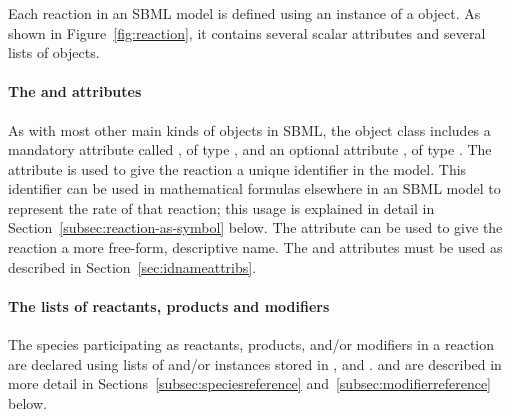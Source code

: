 

\subsubsection{}
\label{sec:reaction-type}
\label{sec:listofreactants}
\label{sec:listofproducts}
\label{sec:listofmodifiers}

Each reaction in an SBML model is defined using an instance of a
\Reaction object.  As shown in Figure~\vref{fig:reaction}, it
contains several scalar attributes and several lists of objects.


\paragraph{The  and  attributes}

As with most other main kinds of objects in SBML, the
\Reaction object class
includes a mandatory attribute called , of type
, and an optional attribute , of type
.  The  attribute is used to give the
reaction a unique identifier in the model.  This identifier can be
used in mathematical formulas elsewhere in an SBML model to
represent the rate of that reaction; this usage is explained in
detail in Section~\ref{subsec:reaction-as-symbol} below.  The
 attribute can be used to give the reaction a more
free-form, descriptive name.  The  and 
attributes must be used as described in
Section~\ref{sec:idnameattribs}.


\paragraph{The lists of reactants, products and modifiers}

The species participating as reactants, products, and/or modifiers
in a reaction are declared using lists of \SpeciesReference and/or
\ModifierSpeciesReference instances stored in
,  and
.  \SpeciesReference and
\ModifierSpeciesReference are described in more detail
in Sections~\ref{subsec:speciesreference}
and~\ref{subsec:modifierreference} below.

